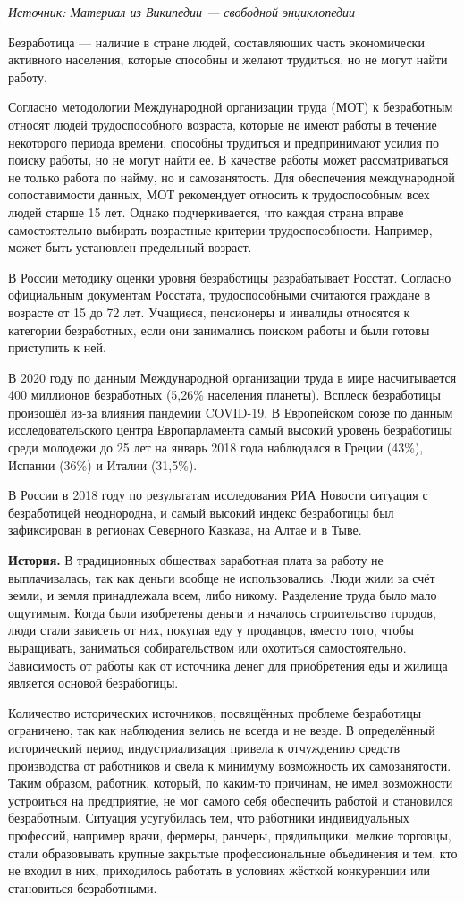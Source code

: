 \textit{Источник: Материал из Википедии — свободной энциклопедии}


Безработица — наличие в стране людей, составляющих часть экономически активного населения, которые способны и желают трудиться, но не могут найти работу.

Согласно методологии Международной организации труда (МОТ) к безработным относят людей трудоспособного возраста, которые не имеют работы в течение некоторого периода времени, способны трудиться и предпринимают усилия по поиску работы, но не могут найти ее. В качестве работы может рассматриваться не только работа по найму, но и самозанятость. Для обеспечения международной сопоставимости данных, МОТ рекомендует относить к трудоспособным всех людей старше 15 лет. Однако подчеркивается, что каждая страна вправе самостоятельно выбирать возрастные критерии трудоспособности. Например, может быть установлен предельный возраст.

В России методику оценки уровня безработицы разрабатывает Росстат. Согласно официальным документам Росстата, трудоспособными считаются граждане в возрасте от 15 до 72 лет. Учащиеся, пенсионеры и инвалиды относятся к категории безработных, если они занимались поиском работы и были готовы приступить к ней.

В 2020 году по данным Международной организации труда в мире насчитывается 400 миллионов безработных (5,26\% населения планеты). Всплеск безработицы произошёл из-за влияния пандемии COVID-19. В Европейском союзе по данным исследовательского центра Европарламента самый высокий уровень безработицы среди молодежи до 25 лет на январь 2018 года наблюдался в Греции (43\%), Испании (36\%) и Италии (31,5\%).

В России в 2018 году по результатам исследования РИА Новости ситуация с безработицей неоднородна, и самый высокий индекс безработицы был зафиксирован в регионах Северного Кавказа, на Алтае и в Тыве.

\textbf{История.} В традиционных обществах заработная плата за работу не выплачивалась, так как деньги вообще не использовались. Люди жили за счёт земли, и земля принадлежала всем, либо никому. Разделение труда было мало ощутимым. Когда были изобретены деньги и началось строительство городов, люди стали зависеть от них, покупая еду у продавцов, вместо того, чтобы выращивать, заниматься собирательством или охотиться самостоятельно. Зависимость от работы как от источника денег для приобретения еды и жилища является основой безработицы.

Количество исторических источников, посвящённых проблеме безработицы ограничено, так как наблюдения велись не всегда и не везде. В определённый исторический период индустриализация привела к отчуждению средств производства от работников и свела к минимуму возможность их самозанятости. Таким образом, работник, который, по каким-то причинам, не имел возможности устроиться на предприятие, не мог самого себя обеспечить работой и становился безработным. Ситуация усугубилась тем, что работники индивидуальных профессий, например врачи, фермеры, ранчеры, прядильщики, мелкие торговцы, стали образовывать крупные закрытые профессиональные объединения и тем, кто не входил в них, приходилось работать в условиях жёсткой конкуренции или становиться безработными.

